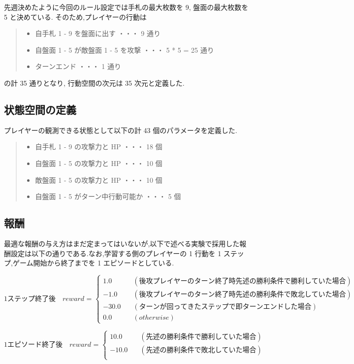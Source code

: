 \documentclass{jarticle}     %
\begin{document}
先週決めたように今回のルール設定では手札の最大枚数を 9, 盤面の最大枚数を 5 と決めている.
そのため,プレイヤーの行動は
\begin{quote}
  \begin{itemize}
   \item 自手札 1 - 9 を盤面に出す ・・・ 9 通り
   \item 自盤面 1 - 5 が敵盤面 1 - 5 を攻撃 ・・・ 5 * 5 = 25 通り
   \item ターンエンド ・・・ 1 通り
  \end{itemize}
 \end{quote}
の計 35 通りとなり, 行動空間の次元は 35 次元と定義した.


\subsection{状態空間の定義}
プレイヤーの観測できる状態として以下の計 43 個のパラメータを定義した.
\begin{quote}
  \begin{itemize}
   \item 自手札 1 - 9 の攻撃力と HP ・・・ 18 個
   \item 自盤面 1 - 5 の攻撃力と HP ・・・ 10 個
   \item 敵盤面 1 - 5 の攻撃力と HP ・・・ 10 個
   \item 自盤面 1 - 5 がターン中行動可能か ・・・ 5 個
  \end{itemize}
 \end{quote}

\subsection{報酬}
最適な報酬の与え方はまだ定まってはいないが,以下で述べる実験で採用した報酬設定は以下の通りである.なお,学習する側のプレイヤーの 1 行動を 1 ステップ,ゲーム開始から終了までを 1 エピソードとしている.

\begin{equation*}
  \mathrm{1 ステップ終了後}
  \quad reward \text{ = }
  \left\{
    \begin{aligned}
        1.0 \quad &(後攻プレイヤーのターン終了時先述の勝利条件で勝利していた場合) \\
        -1.0 \quad  &(後攻プレイヤーのターン終了時先述の勝利条件で敗北していた場合) \\
        -30.0 \quad & (ターンが回ってきたステップで即ターンエンドした場合) \\
        0.0 \quad &(otherwise)
    \end{aligned}
    \right.
\end{equation*}
\par
\begin{equation*}
  \mathrm{1 エピソード終了後}
  \quad reward \text{ = }
  \left\{
    \begin{aligned}
        10.0 \quad &(先述の勝利条件で勝利していた場合) \\
        -10.0 \quad  &(先述の勝利条件で敗北していた場合) \\
    \end{aligned}
    \right.
\end{equation*}
\end{document}
